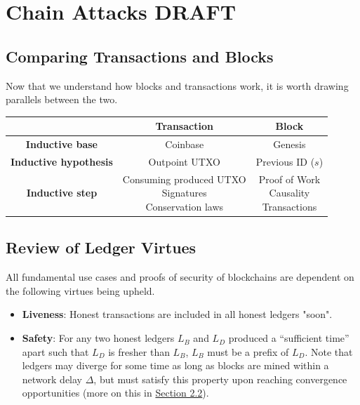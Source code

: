 \chapter{Chain Attacks \small{\textsf{DRAFT}}}\label{chapter:attacks}

\section{Comparing Transactions and Blocks}

Now that we understand how blocks and transactions work, it is worth drawing parallels between the two.
\begin{center}
\begin{tabular}{ |c|c|c| }
  \hline
  & \textbf{Transaction} & \textbf{Block} \\
  \hline
  \textbf{Inductive base} & Coinbase & Genesis \\
  \hline
  \textbf{Inductive hypothesis} & Outpoint UTXO & Previous ID ($s$) \\
  \hline
  \textbf{Inductive step} & \makecell{Consuming produced UTXO \\ Signatures \\ Conservation laws} & \makecell{Proof of Work \\ Causality \\ Transactions} \\
  \hline
\end{tabular}
\end{center}

\section{Review of Ledger Virtues}
All fundamental use cases and proofs of security of blockchains are dependent on the following virtues being upheld.

\begin{itemize}
    \label{sec:liveness}
    \item \textbf{Liveness}: Honest transactions are included in all honest ledgers "soon".
    \label{sec:saftey}
    \item \textbf{Safety}: For any two honest ledgers $L_B$ and $L_D$ produced a ``sufficient time'' apart such that $L_D$ is fresher than $L_B$, $L_B$ must be a prefix of $L_D$. Note that ledgers may diverge for some time as long as blocks are mined within a network delay $\Delta$, but must satisfy this property upon reaching convergence opportunities (more on this in \hyperref[sec:mechanics]{Section 2.2}).
\end{itemize}

